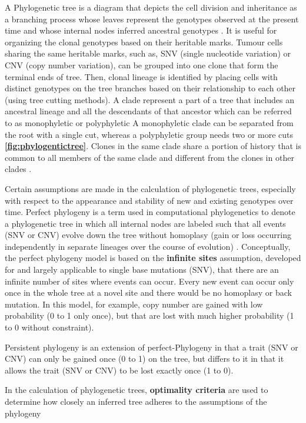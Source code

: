 A Phylogenetic tree is a diagram that depicts the cell division and inheritance as a branching process whose leaves represent the genotypes observed at the present time and whose internal nodes inferred ancestral genotypes \cite{satas2020scarlet}.
It is useful for organizing the clonal genotypes based on their heritable marks. Tumour cells sharing the same heritable marks, such as, SNV (single nucleotide variation) or CNV (copy number variation), can be grouped into one clone that form the terminal ends of tree. Then, clonal lineage is identified by placing cells with distinct genotypes on the tree branches based on their relationship to each other (using tree cutting methods). A clade represent a part of a tree that includes an ancestral lineage and all the descendants of that ancestor which can be referred to as monophyletic or polyphyletic  A monophyletic clade can be separated from the root with a single cut, whereas a polyphyletic group needs two or more cuts \textbf{\autoref{fig:phylogentictree}}. Clones in the same clade share a portion of history that is common to all members of the same clade and different from the clones in other clades \cite{baum2008reading, baum2008phylogenics}.


Certain assumptions are made in the calculation of phylogenetic trees, especially with respect to the appearance and stability of new and existing genotypes over time.
Perfect phylogeny is a term used in computational phylogenetics to denote a phylogenetic tree in which all internal nodes are labeled such that all events (SNV or CNV) evolve down the tree without homoplasy (gain or loss occurring independently in separate lineages over the course of evolution) \cite{gusfield1997algorithms}. Conceptually, the perfect phylogeny model is based on the \textbf{infinite sites} assumption, developed for and largely applicable to single base mutations (SNV), that there are an infinite number of sites  where events can occur. Every new event can occur only once in the whole tree at a novel site and there would be no homoplasy or back mutation. In this model, for example, copy number are gained with low probability (0 to 1 only once), but that are lost with much higher probability (1 to 0 without constraint).

Persistent phylogeny is an extension of perfect-Phylogeny in that a trait (SNV or CNV) can only be gained once (0 to 1) on the tree, but differs to it in that it allows the trait (SNV or CNV) to be lost exactly once (1 to 0).

In the calculation of phylogenetic trees, \textbf{optimality criteria} are used to determine how closely an inferred tree adheres to the assumptions of the phylogeny

